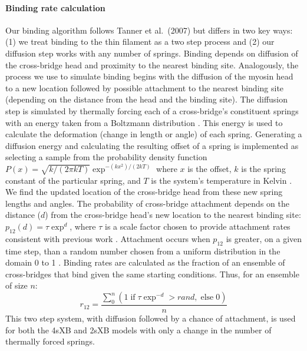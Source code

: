 \documentclass[10pt]{article}
\newcommand{\citep}[1]{\cite{#1}} %
\begin{document}
\paragraph{Binding rate calculation} %
Our binding algorithm follows Tanner et al.~(2007) \citep{Tanner2007} but differs in two key ways: (1) we treat binding to the thin filament as a two step process and (2) our diffusion step works with any number of springs.
Binding depends on diffusion of the cross-bridge head and proximity to the nearest binding site.
Analogously, the process we use to simulate binding begins with the diffusion of the myosin head to a new location followed by possible attachment to the nearest binding site (depending on the distance from the head and the binding site).
The diffusion step is simulated by thermally forcing each of a cross-bridge's constituent springs with an energy taken from a Boltzmann distribution \citep{BergBook, HowardBook}.
This energy is used to calculate the deformation (change in length or angle) of each spring. 
Generating a diffusion energy and calculating the resulting offset of a spring is implemented as selecting a sample from the probability density function $P(x) = \sqrt{k / (2 \pi kT)} \exp^{-(k x^2)/(2 kT)}$ where $x$ is the offset, $k$ is the spring constant of the particular spring, and $T$ is the system's temperature in Kelvin  \citep{DillBook, HowardBook}. %
We find the updated location of the cross-bridge head from these new spring lengths and angles.
The probability of cross-bridge attachment depends on the distance ($d$) from the cross-bridge head's new location to the nearest binding site: $p_{12}(d) = \tau \exp ^{d}$, where $\tau$ is a scale factor chosen to provide attachment rates consistent with previous work \citep{Daniel1998, Tanner2007}.
Attachment occurs when $p_{12}$ is greater, on a given time step, than a random number chosen from a uniform distribution in the domain 0 to 1 \citep{Tanner2007}.
Binding rates are calculated as the fraction of an ensemble of cross-bridges that bind given the same starting conditions. 
Thus, for an ensemble of size $n$: 
$$r_{12} =  \frac{\sum_0^n \left( 1\; \textrm{if}\; \tau \exp^{-d}>rand ,\; \textrm{else}\; 0 \right)}{n}$$
This two step system, with diffusion followed by a chance of attachment, is used for both the 4sXB and 2sXB models with only a change in the number of thermally forced springs.
\end{document}

